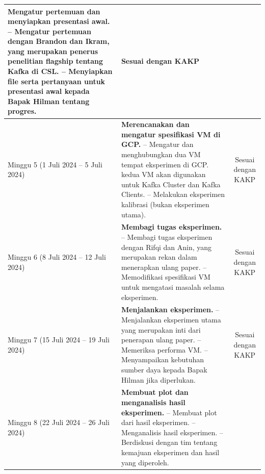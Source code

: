 \begin{longtable}{|p{2.6cm}|p{8cm}|c|}
	\textbf{Mengatur pertemuan dan menyiapkan presentasi awal.}\newline
	-- Mengatur pertemuan dengan Brandon dan Ikram, yang merupakan penerus penelitian flagship tentang Kafka di CSL.\newline
	-- Menyiapkan file serta pertanyaan untuk presentasi awal kepada Bapak Hilman tentang progres.\vspace{0.5cm} &
	Sesuai dengan KAKP \\
	\hline
    Minggu 5\newline
	(1 Juli 2024 -- 5 Juli 2024) &
	\textbf{Merencanakan dan mengatur spesifikasi VM di	GCP.}\newline
	-- Mengatur dan menghubungkan dua VM tempat	eksperimen di GCP. kedua VM akan digunakan untuk Kafka Cluster dan Kafka Clients.\newline
	-- Melakukan eksperimen kalibrasi (bukan eksperimen	utama).\vspace{0.5cm} &
	Sesuai dengan KAKP \\
	\hline
    Minggu 6\newline
	(8 Juli 2024 -- 12 Juli 2024) &
	\textbf{Membagi tugas eksperimen.}\newline
	-- Membagi tugas eksperimen dengan Rifqi dan Anin, yang merupakan rekan dalam menerapkan ulang paper.\newline
	-- Memodifikasi spesifikasi VM untuk mengatasi masalah selama eksperimen.\vspace{0.5cm} &
	Sesuai dengan KAKP \\
	\hline
    Minggu 7\newline
	(15 Juli 2024 -- 19 Juli 2024) &
	\textbf{Menjalankan eksperimen.}\newline
	-- Menjalankan eksperimen utama yang merupakan inti dari penerapan ulang paper.\newline
	-- Memeriksa performa VM.\newline
	-- Menyampaikan kebutuhan sumber daya kepada Bapak Hilman jika diperlukan.\vspace{0.5cm} &
	Sesuai dengan KAKP \\
	\hline
    Minggu 8\newline
	(22 Juli 2024 -- 26 Juli 2024) &
	\textbf{Membuat plot dan menganalisis hasil eksperimen.}\newline
	-- Membuat plot dari hasil eksperimen.\newline
	-- Menganalisis hasil eksperimen.\newline
	-- Berdiskusi dengan tim tentang kemajuan eksperimen dan hasil yang diperoleh.\vspace{0.5cm} &

\end{longtable}
